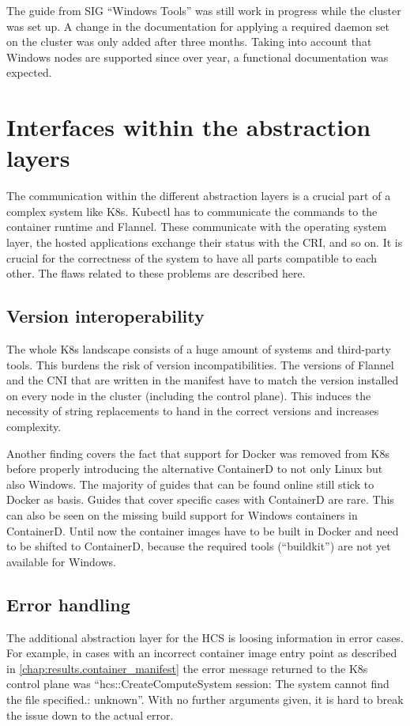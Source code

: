 The guide from \ac{SIG} \enquote{Windows Tools} was still work in progress while the cluster was set up. A change in the documentation for applying a required daemon set on the cluster was only added after three months. Taking into account that Windows nodes are supported since over year, a functional documentation was expected.

\section{Interfaces within the abstraction layers}
The communication within the different abstraction layers is a crucial part of a complex system like \ac{K8s}. Kubectl has to communicate the commands to the container runtime and Flannel. These communicate with the operating system layer, the hosted applications exchange their status with the \ac{CRI}, and so on. 
It is crucial for the correctness of the system to have all parts compatible to each other. The flaws related to these problems are described here. 

\subsection{Version interoperability}
The whole \ac{K8s} landscape consists of a huge amount of systems and third-party tools. This burdens the risk of version incompatibilities. 
The versions of Flannel and the \ac{CNI} that are written in the manifest have to match the version installed on every node in the cluster (including the control plane). This induces the necessity of string replacements to hand in the correct versions and increases complexity.

Another finding covers the fact that support for Docker was removed from \ac{K8s} before properly introducing the alternative ContainerD to not only Linux but also \ac{Windows}. The majority of guides that can be found online still stick to Docker as basis. Guides that cover specific cases with ContainerD are rare.
This can also be seen on the missing build support for \ac{Windows} containers in ContainerD. Until now the container images have to be built in Docker and need to be shifted to ContainerD, because the required tools (\enquote{buildkit}) are not yet available for \ac{Windows}.

\subsection{Error handling}
The additional abstraction layer for the \ac{HCS} is loosing information in error cases. For example, in cases with an incorrect container image entry point as described in \autoref{chap:results.container_manifest} the error message returned to the \ac{K8s} control plane was \enquote{hcs::CreateComputeSystem session: The system cannot find the file specified.: unknown}. With no further arguments given, it is hard to break the issue down to the actual error.

